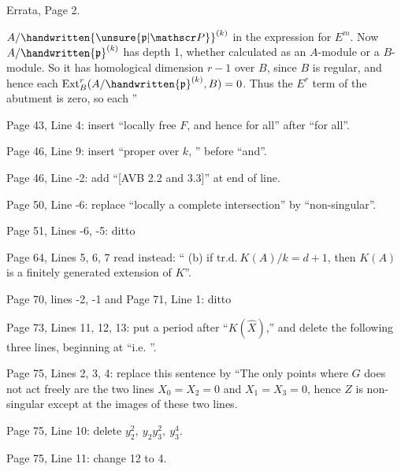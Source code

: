 Errata, Page 2.

$A/\handwritten{\unsure{\mathfrak p|\mathscr P}}^{(k)}$ in the expression for $E^m$. Now $A/\handwritten{\mathfrak p}^{(k)}$ has depth 1, whether calculated as an $A$-module or a $B$-module. So it has homological dimension $r-1$ over $B$, since $B$ is regular, and hence each $\operatorname{Ext}^r_B(A/\handwritten{\mathfrak p}^{(k)},B)=0$. Thus the $E^r$ term of the abutment is zero, so each ''

Page 43, Line 4: insert ``locally free $F$, and hence for all'' after ``for all''.

Page 46, Line 9: insert ``proper over $k$, '' before ``and''.

Page 46, Line -2: add ``[AVB 2.2 and 3.3]'' at end of line.

Page 50, Line -6: replace ``locally a complete intersection'' by ``non-singular''.

Page 51, Lines -6, -5: ditto

Page 64, Lines 5, 6, 7 read instead: `` (b) if $\mathrm{tr.d.}\ K(A)/k=d+1$, then $K(A)$ is a finitely generated extension of $K$''.

Page 70, lines -2, -1 and Page 71, Line 1: ditto

Page 73, Lines 11, 12, 13: put a period after ``$K(\hat X)$,'' and delete the following three lines, beginning at ``i.e. ''.

Page 75, Lines 2, 3, 4: replace this sentence by ``The only points where $G$ does not act freely are the two lines $X_0=X_2=0$ and $X_1=X_3=0$, hence $Z$ is non-singular except at the images of these two lines.

Page 75, Line 10: delete $y_2^2,\ y_2 y_3^2,\ y_3^4$.

Page 75, Line 11: change 12 to 4.

